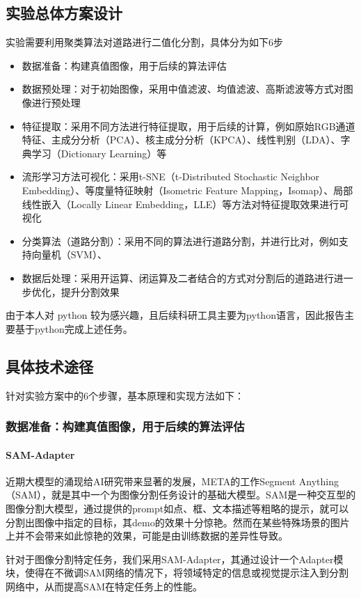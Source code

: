 \documentclass[12pt,hyperref,a4paper,UTF8]{ctexart}
\begin{document}
\subsection{实验总体方案设计}
实验需要利用聚类算法对道路进行二值化分割，具体分为如下6步
\begin{itemize}
    \item 数据准备：构建真值图像，用于后续的算法评估
    \item 数据预处理：对于初始图像，采用中值滤波、均值滤波、高斯滤波等方式对图像进行预处理
    \item 特征提取：采用不同方法进行特征提取，用于后续的计算，例如原始RGB通道特征、主成分分析（PCA）、核主成分分析（KPCA）、线性判别（LDA）、字典学习（Dictionary Learning）等
    \item 流形学习方法可视化：采用t-SNE（t-Distributed Stochastic Neighbor Embedding）、等度量特征映射（Isometric Feature Mapping，Isomap）、局部线性嵌入（Locally Linear Embedding，LLE）等方法对特征提取效果进行可视化
    \item 分类算法（道路分割）：采用不同的算法进行道路分割，并进行比对，例如支持向量机（SVM）、
    \item 数据后处理：采用开运算、闭运算及二者结合的方式对分割后的道路进行进一步优化，提升分割效果

\end{itemize}
由于本人对 python 较为感兴趣，且后续科研工具主要为python语言，因此报告主要基于python完成上述任务。
\subsection{具体技术途径}
针对实验方案中的6个步骤，基本原理和实现方法如下：
\subsubsection{数据准备：构建真值图像，用于后续的算法评估}
\paragraph{SAM-Adapter}
近期大模型的涌现给AI研究带来显著的发展，META的工作Segment Anything（SAM），就是其中一个为图像分割任务设计的基础大模型。SAM是一种交互型的图像分割大模型，通过提供的prompt如点、框、文本描述等粗略的提示，就可以分割出图像中指定的目标，其demo的效果十分惊艳。然而在某些特殊场景的图片上并不会带来如此惊艳的效果，可能是由训练数据的差异性导致。
\par
针对于图像分割特定任务，我们采用SAM-Adapter，其通过设计一个Adapter模块，使得在不微调SAM网络的情况下，将领域特定的信息或视觉提示注入到分割网络中，从而提高SAM在特定任务上的性能。
\par
\end{document}
